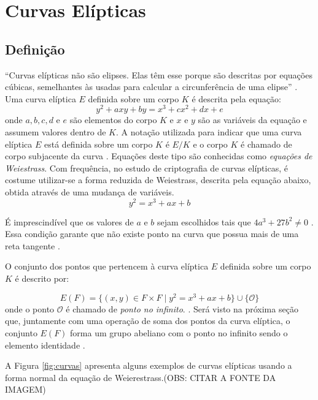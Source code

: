%
%
\section{Curvas Elípticas}

\subsection{Definição}
``Curvas elípticas não são elipses. Elas têm esse porque são descritas por equações cúbicas, semelhantes às usadas para calcular a circunferência de uma elipse'' \cite{Stallings:2011}. Uma curva elíptica $E$ definida sobre um corpo $K$ é descrita pela equação:
\begin{equation}
y^2 + axy + by = x^3 + cx^2 + dx + e \label{eq:5}
\end{equation}
onde \(a, b, c, d\) e \(e\) são elementos do corpo $K$ e \(x\) e \(y\) são as variáveis da equação e assumem valores dentro de $K$. A notação utilizada para indicar que uma curva elíptica $E$ está definida sobre um corpo $K$ é $E/K$ e o corpo $K$ é chamado de corpo subjacente da curva \cite{Guide}. Equações deste tipo são conhecidas como \textit{equações de Weiestrass}. Com frequência, no estudo de criptografia de curvas elípticas, é costume utilizar-se a forma reduzida de Weiestrass, descrita pela equação abaixo, obtida através de uma mudança de variáveis.
\begin{equation}
y^2 = x^3 + ax + b \label{eq:6}
\end{equation}

É imprescindível que os valores de $a$ e $b$ sejam escolhidos tais que $4a^3 + 27b^2 \ne 0$ \cite{Mandy:2007}. Essa condição garante que não existe ponto na curva que possua mais de uma reta tangente \cite{Guide}.

O conjunto dos pontos que pertencem à curva elíptica $E$ definida sobre um corpo $K$ é descrito por:

$$ E(F) = \{(x,y) \in F \times F \mid y^2 = x^3 + ax + b\} \cup \{\mathcal{O}\} $$
onde o ponto $\mathcal{O}$ é chamado de \textit{ponto no infinito}. \cite{Mandy:2007}.
Será visto na próxima seção que, juntamente com uma operação de soma dos pontos da curva elíptica, o conjunto $E(F)$ forma um grupo abeliano com o ponto no infinito sendo o elemento identidade \cite{Guide}.

A Figura \ref{fig:curvas} apresenta alguns exemplos de curvas elípticas usando a forma normal da equação de Weierestrass.(OBS: CITAR A FONTE DA IMAGEM)

